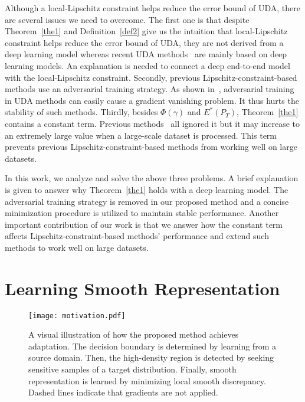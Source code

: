 \documentclass[journal,twocolumn]{IEEEtran}
\theoremstyle{definition}
\begin{document}
Although a local-Lipschitz constraint helps reduce the error bound of UDA, there are several issues we need to overcome. The first one is that despite Theorem~\ref{the1} and Definition~\ref{def2} give us the intuition that local-Lipschitz constraint helps reduce the error bound of UDA, they are not derived from a deep learning model whereas recent UDA methods~\cite{shu2018a,mao2019virtual} are mainly based on deep learning models. An explanation is needed to connect a deep end-to-end model with the local-Lipschitz constraint. Secondly, previous Lipschitz-constraint-based methods use an adversarial training strategy. As shown in~\cite{8833506}, adversarial training in UDA methods can easily cause a gradient vanishing problem. It thus hurts the stability of such methods. Thirdly, besides $\Phi(\gamma)$ and $E^*(P_T)$, Theorem~\ref{the1} contains a constant term. Previous methods~\cite{shu2018a,mao2019virtual} all ignored it but it may increase to an extremely large value when a large-scale dataset is processed. This term prevents previous Lipschitz-constraint-based methods from working well on large datasets.

In this work, we analyze and solve the above three problems. A brief explanation is given to answer why Theorem~\ref{the1} holds with a deep learning model. The adversarial training strategy is removed in our proposed method and a concise minimization procedure is utilized to maintain stable performance. Another important contribution of our work is that we answer how the constant term affects Lipschitz-constraint-based methods' performance and extend such methods to work well on large datasets.

\section{Learning Smooth Representation}
\label{ourmethod}

\begin{figure*}[htp]
\centering
\texttt{[image: motivation.pdf]}
\caption{A visual illustration of how the proposed method achieves adaptation. The decision boundary is determined by learning from a source domain. Then, the high-density region is detected by seeking sensitive samples of a target distribution. Finally, smooth representation is learned by minimizing local smooth discrepancy. Dashed lines indicate that gradients are not applied.}
\label{fig:motivation}
\end{figure*} 
\end{document}
